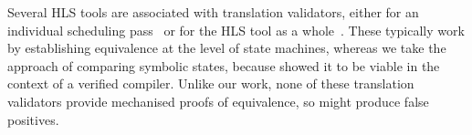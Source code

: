 Several \gls{HLS} tools are associated with translation validators, either for
an individual scheduling
pass~\cite{chouksey20_verif_sched_condit_behav_high_level_synth,
  karfa06_formal_verif_method_sched_high_synth, kim04_autom_fsmd} or for the
\gls{HLS} tool as a whole~\cite{mentor20_catap_high_level_synth,
  tiemeyer19_crest}. These typically work by establishing equivalence at the
level of state machines, whereas we take the approach of comparing symbolic
states, because \textcite{tristan08_formal_verif_trans_valid} showed it to be
viable in the context of a verified compiler. Unlike our work, none of these
translation validators provide mechanised proofs of equivalence, so might
produce false positives.







